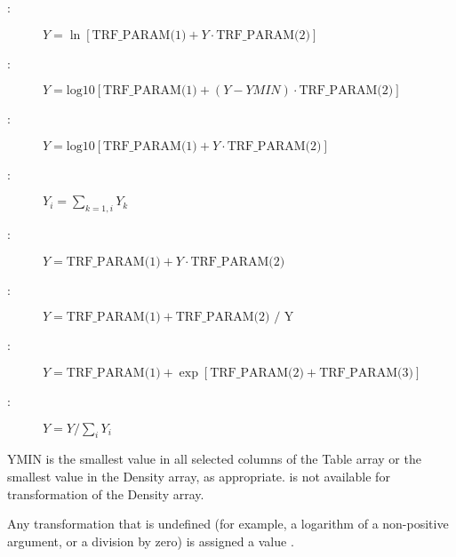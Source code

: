 {{{{{\begin{description}
    \item[:]  $Y = \ln[\mbox{TRF\_PARAM(1)} + 
                            Y \cdot \mbox{TRF\_PARAM(2)}]$

    \item[:]  $Y = \mbox{log10}[\mbox{TRF\_PARAM(1)} + 
                            (Y-YMIN) \cdot \mbox{TRF\_PARAM(2)}]$

    \item[:]  $Y = \mbox{log10}[\mbox{TRF\_PARAM(1)} + 
                            Y \cdot \mbox{TRF\_PARAM(2)}]$

    \item[:]  $Y_i = \sum_{k=1,i} Y_k$

    \item[:]  $Y = \mbox{TRF\_PARAM(1)} + 
                            Y \cdot \mbox{TRF\_PARAM(2)}$

    \item[:]  $Y = \mbox{TRF\_PARAM(1)} + 
                              \mbox{TRF\_PARAM(2) / Y}$

    \item[:]  $Y = \mbox{TRF\_PARAM(1)} +
                              \exp[\mbox{TRF\_PARAM(2)} + \mbox{TRF\_PARAM(3)}]$

    \item[:]  $Y = Y / \sum_i Y_i$
   \end{description}

    YMIN is the smallest value in all selected columns of the 
    Table array or the smallest value in the Density array,
    as appropriate.  is not available for 
    transformation of the Density array.

    Any transformation that is undefined (for example, a logarithm 
    of a non-positive argument, or a division by zero) is assigned
    a value .
}









}}}}
